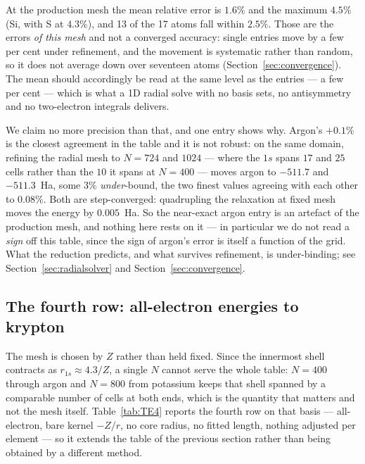 \documentclass[11pt]{article}
\begin{document}
At the production mesh the mean relative error is $1.6\%$ and the maximum $4.5\%$ (Si, with S at
$4.3\%$), and 13 of the 17 atoms fall within $2.5\%$. Those are the errors \emph{of this mesh} and
not a converged accuracy: single entries move by a few per cent under refinement, and the movement
is systematic rather than random, so it does not average down over seventeen atoms
(Section~\ref{sec:convergence}). The mean should accordingly be read at the same level as the
entries --- a few per cent --- which is what a 1D radial solve with no basis sets, no antisymmetry
and no two-electron integrals delivers.

We claim no more precision than that, and one entry shows why. Argon's $+0.1\%$ is the closest
agreement in the table and it is not robust: on the same domain, refining the radial mesh to
$N=724$ and $1024$ --- where the $1s$ spans $17$ and $25$ cells rather than the $10$ it spans at
$N=400$ --- moves argon to $-511.7$ and $-511.3$~Ha, some $3\%$ \emph{under}-bound, the two finest
values agreeing with each other to $0.08\%$. Both are step-converged: quadrupling the relaxation at
fixed mesh moves the energy by $0.005$~Ha. So the near-exact argon entry is an artefact of the
production mesh, and nothing here rests on it --- in particular we do not read a \emph{sign} off
this table, since the sign of argon's error is itself a function of the grid. What the reduction
predicts, and what survives refinement, is under-binding; see
Section~\ref{sec:radialsolver} and Section~\ref{sec:convergence}.

\subsection{The fourth row: all-electron energies to krypton}\label{sec:TE4}

The mesh is chosen by $Z$ rather than held fixed. Since the innermost shell contracts as
$r_{1s}\approx 4.3/Z$, a single $N$ cannot serve the whole table: $N=400$ through argon and $N=800$
from potassium keeps that shell spanned by a comparable number of cells at both ends, which is the
quantity that matters and not the mesh itself. Table~\ref{tab:TE4} reports the fourth row on that
basis --- all-electron, bare kernel $-Z/r$, no core radius, no fitted length, nothing adjusted per
element --- so it extends the table of the previous section rather than being obtained by a
different method.
\end{document}
